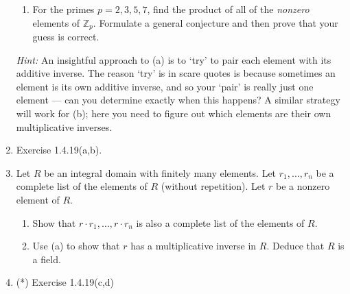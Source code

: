 \documentclass[11pt]{article}
\def\Z{\mathbb{Z}}
\theoremstyle{plain}
\theoremstyle{remark}
\begin{document}
\begin{enumerate}
\begin{enumerate}
\item For the primes $p=2,3,5, 7$, find the product of all of the \emph{nonzero} elements of $\Z_p$. Formulate a general conjecture and then prove that your guess is correct.

\end{enumerate}

{\scriptsize \emph{Hint:} An insightful approach to (a) is to `try' to pair each element with its additive inverse. The reason `try' is in scare quotes is because sometimes an element is its own additive inverse, and so your `pair' is really just one element --- can you determine exactly when this happens? A similar strategy will work for (b); here you need to figure out which elements are their own multiplicative inverses.}

\item Exercise 1.4.19(a,b).

\item Let $R$ be an integral domain with finitely many elements. Let $r_1, \dots, r_n$ be a complete list of the elements of $R$ (without repetition). Let $r$ be a nonzero element of $R$.
\begin{enumerate}
	\item Show that $r\cdot r_1, \dots, r \cdot r_n$ is also a complete list of the elements of $R$. 
	\item Use (a) to show that $r$ has a multiplicative inverse in $R$. Deduce that $R$ is a field.
\end{enumerate}

\item (*) Exercise 1.4.19(c,d)

\end{enumerate}
\end{document}
